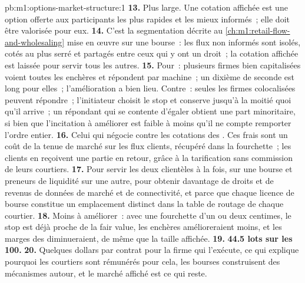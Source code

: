\begin{solution}{pb:m1:options-market-structure:1}
\textbf{13.} Plus large. Une cotation affichée est une option offerte aux participants les plus rapides et
les mieux informés~; elle doit être valorisée pour eux.
\textbf{14.} C'est la segmentation décrite au \cref{ch:m1:retail-flow-and-wholesaling}
mise en œuvre sur une bourse~: les flux non informés sont isolés, cotés au plus serré et partagés
entre ceux qui y ont un droit~; la cotation affichée est laissée pour servir
tous les autres.
\textbf{15.} Pour~: plusieurs firmes bien capitalisées voient toutes les enchères et
répondent par machine~; un dixième de seconde est long pour elles~; l'amélioration
a bien lieu. Contre~: seules les firmes colocalisées peuvent répondre~; l'initiateur choisit le
stop et conserve jusqu'à la moitié quoi qu'il arrive~; un répondant qui se contente d'égaler
obtient une part minoritaire, si bien que l'incitation à améliorer est faible à moins qu'il ne compte
remporter l'ordre entier.
\textbf{16.} Celui qui négocie contre les cotations des . Ces frais sont un
coût de la tenue de marché sur les flux clients, récupéré dans la fourchette~; les clients
en reçoivent une partie en retour, grâce à la tarification sans commission de leurs courtiers.
\textbf{17.} Pour servir les deux clientèles à la fois,  sur une bourse
et preneurs de liquidité sur une autre, pour obtenir davantage de droits et de revenus
de données de marché et de connectivité, et parce que chaque licence de bourse
constitue un emplacement distinct dans la table de routage de chaque courtier.
\textbf{18.} Moins à améliorer~: avec une fourchette d'un ou deux centimes, le stop est
déjà proche de la fair value, les enchères amélioreraient moins, et les marges des 
diminueraient, de même que la taille affichée.
\textbf{19.} \textbf{44.5 lots sur les 100.}
\textbf{20.} Quelques dollars par contrat pour la firme qui l'exécute, ce qui explique pourquoi
les courtiers sont rémunérés pour cela, les bourses construisent des mécanismes autour, et le
marché affiché est ce qui reste.
\end{solution}

